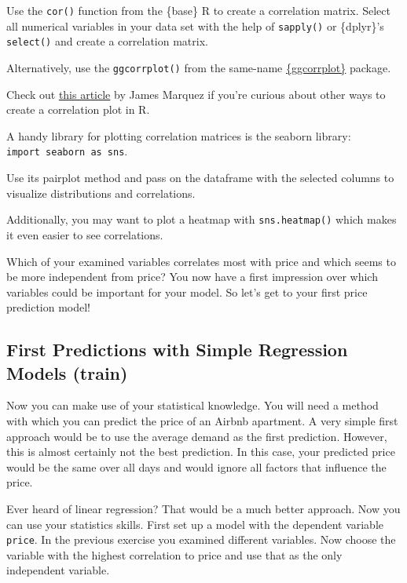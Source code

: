 \documentclass[
  11pt,
]{article}
\newenvironment{tips}[1]
  {
  \begin{itemize}
  \footnotesize
  \renewcommand{\labelitemi}{
    \raisebox{-.7\height}[0pt][0pt]{
      {\setkeys{Gin}{width=3em,keepaspectratio}
        \texttt{[image: images/\#1.png]}}
    }
  }
  \setlength{\fboxsep}{1em}
  \begin{rbox}
  \item
  }
  {
  \end{rbox}
  \end{itemize}
  }
\newenvironment{tipsp}[1]
  {
  \begin{itemize}
  \footnotesize
  \renewcommand{\labelitemi}{
    \raisebox{-.7\height}[0pt][0pt]{
      {\setkeys{Gin}{width=3em,keepaspectratio}
        \texttt{[image: images/\#1.png]}}
    }
  }
  \setlength{\fboxsep}{1em}
  \begin{pbox}
  \item
  }
  {
  \end{pbox}
  \end{itemize}
  }
\begin{document}
\begin{tips}r
Use the \texttt{cor()} function from the \{base\} R to create a correlation matrix. Select all numerical variables in your data set with the help of \texttt{sapply()} or \{dplyr\}'s \texttt{select()} and create a correlation matrix.

Alternatively, use the \texttt{ggcorrplot()} from the same-name \href{https://cran.r-project.org/package=ggcorrplot}{\{ggcorrplot\}} package.

Check out \href{http://jamesmarquezportfolio.com/correlation_matrices_in_r.html}{this article} by James Marquez if you're curious about other ways to create a correlation plot in R.

\end{tips}

\begin{tipsp}p
A handy library for plotting correlation matrices is the seaborn library: \texttt{import\ seaborn\ as\ sns}.

Use its pairplot method and pass on the dataframe with the selected columns to visualize distributions and correlations.

Additionally, you may want to plot a heatmap with \texttt{sns.heatmap()} which makes it even easier to see correlations.

\end{tipsp}

Which of your examined variables correlates most with price and which seems to be more independent from price? You now have a first impression over which variables could be important for your model. So let's get to your first price prediction model!

\hypertarget{first-predictions-with-simple-regression-models-train}{%
\subsection{First Predictions with Simple Regression Models (train)}\label{first-predictions-with-simple-regression-models-train}}

Now you can make use of your statistical knowledge. You will need a method with which you can predict the price of an Airbnb apartment. A very simple first approach would be to use the average demand as the first prediction. However, this is almost certainly not the best prediction. In this case, your predicted price would be the same over all days and would ignore all factors that influence the price.

Ever heard of linear regression? That would be a much better approach. Now you can use your statistics skills. First set up a model with the dependent variable \texttt{price}. In the previous exercise you examined different variables. Now choose the variable with the highest correlation to price and use that as the only independent variable.
\end{document}

